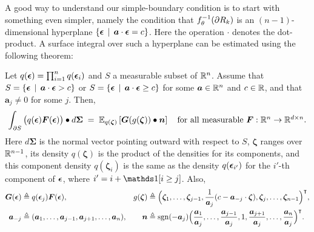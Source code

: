A good way to understand our simple-boundary condition is to start with something even simpler, namely the condition that $f^{-1}_\theta(\partial R_k)$ is an $(n{-}1)$-dimensional hyperplane $\{\bm{\epsilon} \,\mid\, \bm{a} \cdot \bm{\epsilon} = c\}$.
Here the operation $\cdot$ denotes the dot-product.
A surface integral over such a hyperplane can be estimated using  %
the following theorem:
\begin{theorem}\label{thm:est-surface-integral}
Let $q(\bm{\epsilon}) = \prod_{i=1}^n q(\bm{\epsilon}_i)$ and $S$ a measurable subset of $\mathbb{R}^n$.
Assume that $S = \{\bm{\epsilon} \,\mid\, \bm{a} \cdot \bm{\epsilon} > c\}$ or 
$S = \{\bm{\epsilon} \,\mid\, \bm{a} \cdot \bm{\epsilon} \geq c\}$ for some $\bm{a} \in \mathbb{R}^n$ and $c \in \mathbb{R}$,
and that $\bm{a}_j \neq 0$ for some $j$. Then,
\[
\int_{\partial S} \big(q(\bm{\epsilon}) \bm{F}(\bm{\epsilon})\big) \bullet d\bm{\Sigma}
\;= \;
\mathbb{E}_{q(\bm{\zeta})}\left[{\bm{G}(g(\bm{\zeta})) \bullet \bm{n}}\right]
\quad\mbox{for all measurable $\bm{F} : \mathbb{R}^n \to \mathbb{R}^{d\times n}$}. 
\]
Here $d\bm{\Sigma}$ is the normal vector pointing outward with respect to
$S$,
$\bm{\zeta}$ ranges over $\mathbb{R}^{n-1}$, its density $q(\bm{\zeta})$ is the product
of the densities for its components, and this component density $q(\bm{\zeta}_i)$
is the same as the density $q(\bm{\epsilon}_{i'})$ for the $i'$-th component of $\bm{\epsilon}$,
where $i'=i + \indc{i \geq j}$.
Also,
\begin{align*}
\bm{G}(\bm{\epsilon}) & \triangleq
q(\bm{\epsilon}_j) \bm{F}(\bm{\epsilon}),
&
g(\bm{\zeta}) & \triangleq
\Big(\bm{\zeta}_1,\ldots,\bm{\zeta}_{j-1},
\frac{1}{\bm{a}_j}(c-\bm{a}_{-j}\cdot\bm{\zeta}),
\bm{\zeta}_{j},\ldots,\bm{\zeta}_{n-1}\Big)^\intercal,
\\
\bm{a}_{-j} & \triangleq (\bm{a}_1, \ldots, \bm{a}_{j-1}, \bm{a}_{j+1}, \ldots, \bm{a}_n),
&
\bm{n} & \triangleq
\mathrm{sgn}({-\bm{a}_j}) \Big(\frac{\bm{a}_1}{\bm{a}_j},\ldots,\frac{\bm{a}_{j-1}}{\bm{a}_j},1,\frac{\bm{a}_{j+1}}{\bm{a}_j},\ldots,\frac{\bm{a}_n}{\bm{a}_j}\Big)^\intercal.
\end{align*}
\end{theorem}
